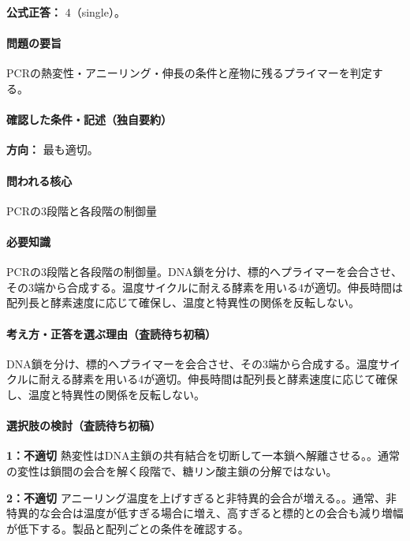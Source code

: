\textbf{公式正答：} 4（single）。

\paragraph{問題の要旨} PCRの熱変性・アニーリング・伸長の条件と産物に残るプライマーを判定する。

\paragraph{確認した条件・記述（独自要約）}\mbox{}\par

\noindent\textbf{方向：} 最も適切。\par

\paragraph{問われる核心} PCRの3段階と各段階の制御量

\paragraph{必要知識} PCRの3段階と各段階の制御量。DNA鎖を分け、標的へプライマーを会合させ、その3端から合成する。温度サイクルに耐える酵素を用いる4が適切。伸長時間は配列長と酵素速度に応じて確保し、温度と特異性の関係を反転しない。

\paragraph{考え方・正答を選ぶ理由（査読待ち初稿）} DNA鎖を分け、標的へプライマーを会合させ、その3端から合成する。温度サイクルに耐える酵素を用いる4が適切。伸長時間は配列長と酵素速度に応じて確保し、温度と特異性の関係を反転しない。

\paragraph{選択肢の検討（査読待ち初稿）}\mbox{}\par

\noindent\textbf{1：不適切} 熱変性はDNA主鎖の共有結合を切断して一本鎖へ解離させる。。通常の変性は鎖間の会合を解く段階で、糖リン酸主鎖の分解ではない。\par

\noindent\textbf{2：不適切} アニーリング温度を上げすぎると非特異的会合が増える。。通常、非特異的な会合は温度が低すぎる場合に増え、高すぎると標的との会合も減り増幅が低下する。製品と配列ごとの条件を確認する。\par

